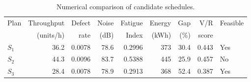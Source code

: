 \begin{table}[htbp]
\centering
\caption{Numerical comparison of candidate schedules.}
\label{tab:numerical-sim}
\small
\begin{tabular}{@{}lrrrrrrrl@{}}
\toprule
Plan & Throughput & Defect & Noise & Fatigue & Energy & Gap & V/R & Feasible \\
     & (units/h)  & rate   & (dB)  & Index   & (kWh)  & (\%) & score &         \\
\midrule
$S_{1}$ & 36.2 & 0.0078 & 78.6 & 0.2996 & 373 & 30.4 & 0.443 & Yes \\
$S_{2}$ & 44.3 & 0.0096 & 83.7 & 0.5388 & 445 & 25.9 & 0.457 & No \\
$S_{3}$ & 28.4 & 0.0078 & 78.9 & 0.2913 & 368 & 52.4 & 0.387 & Yes \\
\bottomrule
\end{tabular}
\end{table}
